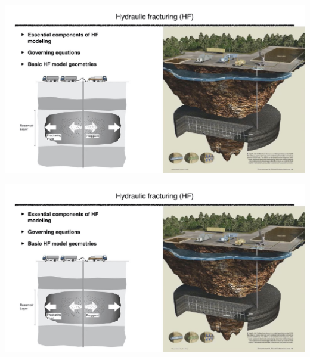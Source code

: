 \documentclass[main.tex]{subfiles}
\begin{document}
\includegraphics[width=\textwidth, page=84]{HF_slides.pdf}

\includegraphics[width=\textwidth, page=85]{HF_slides.pdf}
\end{document}
